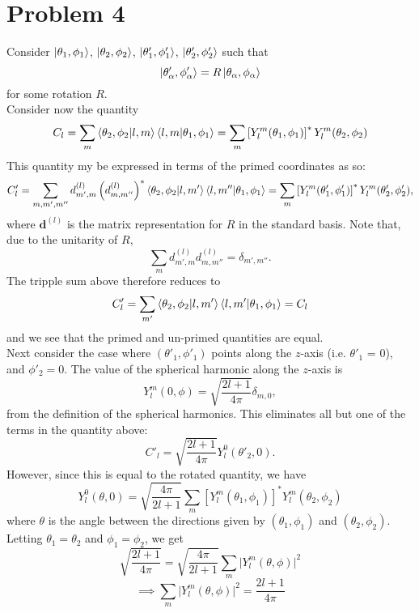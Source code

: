 \documentclass[12pt]{article}
\newcommand{\magsq}[1]{\big|#1\big|^2}
\begin{document}
\section*{Problem 4}
Consider $\ket{\theta_1,\phi_1}$, $\ket{\theta_2, \phi_2}$, $\ket{\theta'_1, \phi'_1}$, $\ket{\theta'_2,\phi'_2}$ such that 
\[ \ket{\theta'_\alpha, \phi'_\alpha} = R\ket{\theta_\alpha, \phi_\alpha} \]
for some rotation $R$. \\
Consider now the quantity
\[ C_l = \sum_m \braket{\theta_2, \phi_2}{l,m}\braket{l,m}{\theta_1, \phi_1} = \sum_m \left[Y_l^m(\theta_1, \phi_1)\right]^* Y_l^m(\theta_2, \phi_2) \]
This quantity my be expressed in terms of the primed coordinates as so:
\[ C'_l = \sum_{m,m',m''}d_{m',m}^{(l)}\left(d_{m,m''}^{(l)}\right)^*\braket{\theta_2,\phi_2}{l,m'}\braket{l,m''}{\theta_1, \phi_1} = \sum_m\left[Y_l^m(\theta'_1,\phi'_1)\right]^* Y_l^m(\theta'_2, \phi'_2), \]
where $\mathbf{d}^{(l)}$ is the matrix representation for $R$ in the standard basis. Note that, due to the unitarity of $R$,
\[ \sum_m d_{m',m}^{(l)}d_{m,m''}^{(l)} = \delta_{m',m''}. \]
The tripple sum above therefore reduces to 
\[ C'_l = \sum_{m'} \braket{\theta_2,\phi_2}{l,m'}\braket{l,m'}{\theta_1, \phi_1} = C_l \]
and we see that the primed and un-primed quantities are equal. \\
Next consider the case where $(\theta'_1, \phi'_1)$ points along the $z$-axis (i.e. $\theta'_1$ = 0), and $\phi'_2 = 0$. The value of the spherical harmonic along the $z$-axis is
\[ Y_l^m(0, \phi) = \sqrt{\frac{2l+1}{4\pi}}\delta_{m,0}, \]
from the definition of the spherical harmonics. This eliminates all but one of the terms in the quantity above:
\[ C'_l = \sqrt{\frac{2l+1}{4\pi}}Y_l^0(\theta'_2, 0). \]
However, since this is equal to the rotated quantity, we have
\[ Y_l^0(\theta, 0) = \sqrt{\frac{4\pi}{2l+1}}\sum_m \left[Y_l^m(\theta_1, \phi_1)\right]^* Y_l^m(\theta_2, \phi_2) \]
where $\theta$ is the angle between the directions given by $(\theta_1, \phi_1)$ and $(\theta_2, \phi_2)$. Letting $\theta_1 = \theta_2$ and $\phi_1 = \phi_2$, we get
\[ \sqrt{\frac{2l+1}{4\pi}} = \sqrt{\frac{4\pi}{2l+1}}\sum_m\magsq{Y_l^m(\theta, \phi)} \]
\[ \implies \sum_m\magsq{Y_l^m(\theta, \phi)} = \frac{2l+1}{4\pi} \]
\end{document}
